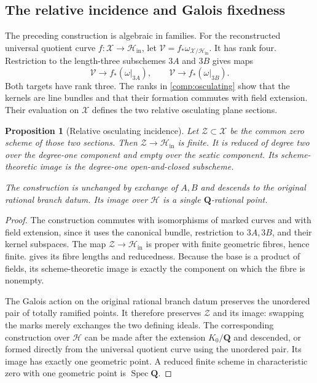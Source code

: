 \documentclass[11pt]{amsart}
\newtheorem{proposition}[proposition]{Proposition}
\theoremstyle{definition}
\theoremstyle{remark}
\newcommand{\QQ}{\mathbf Q}
\begin{document}
\subsection{The relative incidence and Galois fixedness}

The preceding construction is algebraic in families.
For the reconstructed universal quotient curve
$f:\mathcal X\to\mathcal H_{\mathrm{in}}$, let
$\mathcal V=f_*\omega_{\mathcal X/\mathcal H_{\mathrm{in}}}$.
It has rank four.  Restriction to the length-three subschemes $3A$ and $3B$ gives maps
\[
 \mathcal V\longrightarrow f_*(\omega|_{3A}),\qquad
 \mathcal V\longrightarrow f_*(\omega|_{3B}).
\]
Both targets have rank three.  The ranks in \cref{comp:osculating}
show that the kernels are line bundles and that their formation
commutes with field extension.  Their evaluation on $\mathcal X$
defines the two relative osculating plane sections.

\begin{proposition}[Relative osculating incidence]
\label{prop:relative-osculating}
Let $\mathcal Z\subset\mathcal X$ be the common zero scheme of those
two sections.  Then $\mathcal Z\to\mathcal H_{\mathrm{in}}$ is finite.
It is reduced of degree two over the degree-one component and empty
over the sextic component.  Its scheme-theoretic image is the
degree-one open-and-closed subscheme.

The construction is unchanged by exchange of $A,B$ and descends
to the original rational branch datum.  Its image over $\mathcal H$
is a single $\QQ$-rational point.
\end{proposition}

\begin{proof}
The construction commutes with isomorphisms of marked curves and with
field extension, since it uses the canonical bundle, restriction to
$3A,3B$, and their kernel subspaces.
The map $\mathcal Z\to\mathcal H_{\mathrm{in}}$ is proper with finite
geometric fibres, hence finite.
 gives its fibre lengths and reducedness.
Because the base is a product of fields, its scheme-theoretic image
is exactly the component on which the fibre is nonempty.

The Galois action on the original rational branch datum preserves
the unordered pair of totally ramified points.  It therefore
preserves $\mathcal Z$ and its image: swapping the marks merely
exchanges the two defining ideals.
The corresponding construction over $\mathcal H$ can be made
after the extension $K_0/\QQ$ and descended, or formed directly
from the universal quotient curve using the unordered pair.
Its image has exactly one geometric point.
A reduced finite scheme in characteristic zero with one geometric
point is $\operatorname{Spec}\QQ$.
\end{proof}
\end{document}
